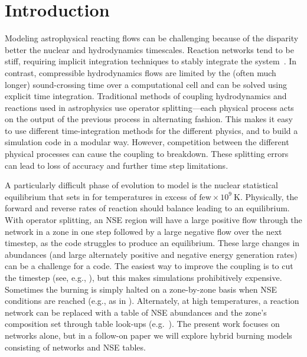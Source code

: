 \documentclass[times,preprint]{aastex63}
\begin{document}

\section{Introduction}\label{Sec:Introduction}

Modeling astrophysical reacting flows can be challenging because of
the disparity better the nuclear and hydrodynamics timescales.
Reaction networks tend to be stiff, requiring implicit integration
techniques to stably integrate the system~\citep{BYRNE19871}.  In contrast, compressible
hydrodynamics flows are limited by the (often much longer)
sound-crossing time over a computational cell and can be solved using
explicit time integration. Traditional methods of coupling
hydrodynamics and reactions used in astrophysics use operator
splitting---each physical process acts on the output of the previous
process in alternating fashion.  This makes it easy to use different
time-integration methods for the different physics, and to build a
simulation code in a modular way.  However, competition between the
different physical processes can cause the coupling to breakdown.
These splitting errors can lead to loss of accuracy and further time
step limitations.

A particularly difficult phase of evolution to model is the nuclear
statistical equilibrium that sets in for temperatures in excess of
$\mbox{few} \times 10^9~\mathrm{K}$.  Physically, the forward and
reverse rates of reaction should balance leading to an equilibrium.
With operator splitting, an NSE region will have a large positive flow
through the network in a zone in one step followed by a large negative
flow over the next timestep, as the code struggles to produce an
equilibrium.  These large changes in abundances (and large alternately
positive and negative energy generation rates) can be a challenge for
a code.  The easiest way to improve the coupling is to cut the
timestep (see, e.g., \citealt{couch:2015}), but this makes simulations
prohibitively expensive.  Sometimes the burning is simply halted on a
zone-by-zone basis when NSE conditions are reached (e.g., as in
\citealt{hedet}).  Alternately, at high temperatures, a reaction
network can be replaced with a table of NSE abundances and the zone's
composition set through table look-ups (e.g.\ \citealt{ma:2013}).  The
present work focuses on networks alone, but in a follow-on paper we
will explore hybrid burning models consisting of networks and NSE
tables.
\end{document}
